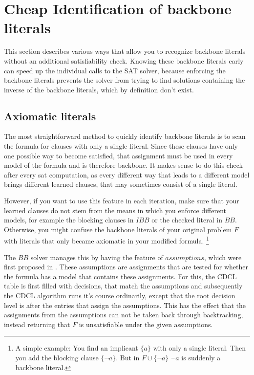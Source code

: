 \section{Cheap Identification of backbone literals}
This section describes various ways that allow you to recognize backbone literals without an additional satisfiability check. Knowing these backbone literals early can speed up the individual calls to the SAT solver, because enforcing the backbone literals prevents the solver from trying to find solutions containing the inverse of the backbone literals, which by definition don't exist.


\subsection{Axiomatic literals}
The most straightforward method to quickly identify backbone literals is to scan the formula for clauses with only a single literal. Since these clauses have only one possible way to become satisfied, that assignment must be used in every model of the formula and is therefore backbone. It makes sense to do this check after every sat computation, as every different way that leads to a different model brings different learned clauses, that may sometimes consist of a single literal.

However, if you want to use this feature in each iteration, make sure that your learned clauses do not stem from the means in which you enforce different models, for example the blocking clauses in $IBB$ or the checked literal in $BB$. Otherwise, you might confuse the backbone literals of your original problem $F$ with literals that only became axiomatic in your modified formula. \footnote{A simple example: You find an implicant $\{a\}$ with only a single literal. Then you add the blocking clause $\{\neg a\}$. But in $F \cup \{\neg a\}$ $\neg a$ is suddenly a backbone literal.}

The $BB$ solver manages this by having the feature of $assumptions$, which were first proposed in \cite{ENSO03}. These assumptions are assignments that are tested for whether the formula has a model that contains these assignments. For this, the CDCL table is first filled with decisions, that match the assumptions and subsequently the CDCL algorithm runs it's course ordinarily, except that the root decision level is after the entries that assign the assumptions. This has the effect that the assignments from the assumptions can not be taken back through backtracking, instead returning that $F$ is unsatisfiable under the given assumptions.

